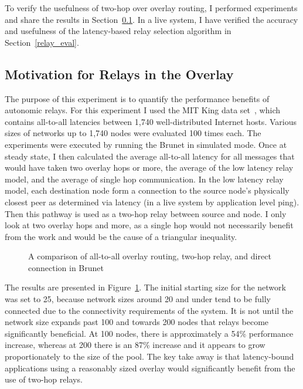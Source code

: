To verify the usefulness of two-hop over overlay routing, I performed
experiments and share the results in Section~\ref{relay_motivation}.  In a live
system, I have verified the accuracy and usefulness of the latency-based relay
selection algorithm in Section~\ref{relay_eval}.

\subsection{Motivation for Relays in the Overlay}
\label{relay_motivation}

The purpose of this experiment is to quantify the performance benefits of
autonomic relays.  For this experiment I used the MIT King data
set~\cite{king_data}, which contains all-to-all latencies between 1,740
well-distributed Internet hosts.  Various sizes of networks up to 1,740 nodes
were evaluated 100 times each.  The experiments were executed by running the
Brunet in simulated mode.  Once at steady state, I then calculated the average
all-to-all latency for all messages that would have taken two overlay hops or
more, the average of the low latency relay model, and the average of single hop
communication.  In the low latency relay model, each destination node form a
connection to the source node's physically closest peer as determined via
latency (in a live system by application level ping).  Then this pathway is
used as a two-hop relay between source and node.  I only look at two overlay
hops and more, as a single hop would not necessarily benefit from the work and
would be the cause of a triangular inequality.  

\begin{figure}
\centering
{}
\caption{A comparison of all-to-all overlay
routing, two-hop relay, and direct connection in Brunet}
\label{fig:simulated_relays}
\end{figure}

The results are presented in Figure~\ref{fig:simulated_relays}.  The initial
starting size for the network was set to 25, because network sizes around 20
and under tend to be fully connected due to the connectivity requirements of
the system.  It is not until the network size expands past 100 and towards 200
nodes that relays become significantly beneficial.  At 100 nodes, there is
approximately a 54\% performance increase, whereas at 200 there is an 87\%
increase and it appears to grow proportionately to the size of the pool.  The
key take away is that latency-bound applications using a reasonably sized
overlay would significantly benefit from the use of two-hop relays.

